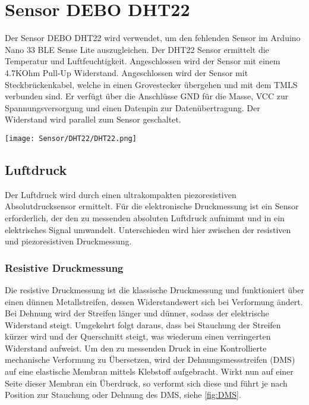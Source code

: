 %
%

\chapter{Sensor DEBO DHT22 }

Der Sensor DEBO DHT22 wird verwendet, um den fehlenden Sensor im Arduino Nano 33 BLE Sense Lite auszugleichen. Der DHT22 Sensor ermittelt die Temperatur und Luftfeuchtigkeit. Angeschlossen wird der Sensor mit einem 4.7KOhm Pull-Up Widerstand. Angeschlossen wird der Sensor mit Steckbrückenkabel, welche in einen Grovestecker übergehen und mit dem TMLS verbunden sind. Er verfügt über die Anschlüsse GND für die Masse, VCC zur Spannungsversorgung und einen Datenpin zur Datenübertragung. Der Widerstand wird parallel zum Sensor geschaltet.

\begin{center}
    \texttt{[image: Sensor/DHT22/DHT22.png]}
    
\end{center} 


\section{Luftdruck}

Der Luftdruck wird durch einen ultrakompakten piezoresistiven Absolutdrucksensor ermittelt. Für die elektronische Druckmessung ist ein Sensor erforderlich, der den zu messenden absoluten Luftdruck aufnimmt und in ein elektrisches Signal umwandelt. Unterschieden wird hier zwischen der resistiven und piezoresistiven Druckmessung. 

\subsection{Resistive Druckmessung}

Die resistive Druckmessung ist die klassische Druckmessung und funktioniert über einen dünnen Metallstreifen, dessen Widerstandswert sich bei Verformung ändert. Bei Dehnung wird der Streifen länger und dünner, sodass der elektrische Widerstand steigt. Umgekehrt folgt daraus, dass bei Stauchung der Streifen kürzer wird und der Querschnitt steigt, was wiederum einen verringerten Widerstand aufweist. Um den zu messenden Druck in eine Kontrollierte mechanische Verformung zu Übersetzen, wird der Dehnungsmessstreifen (DMS) auf eine elastische Membran mittels Klebstoff aufgebracht. 
Wirkt nun auf einer Seite dieser Membran ein Überdruck, so verformt sich diese und führt je nach Position zur Stauchung oder Dehnung des DMS, siehe \ref{fig:DMS}.

